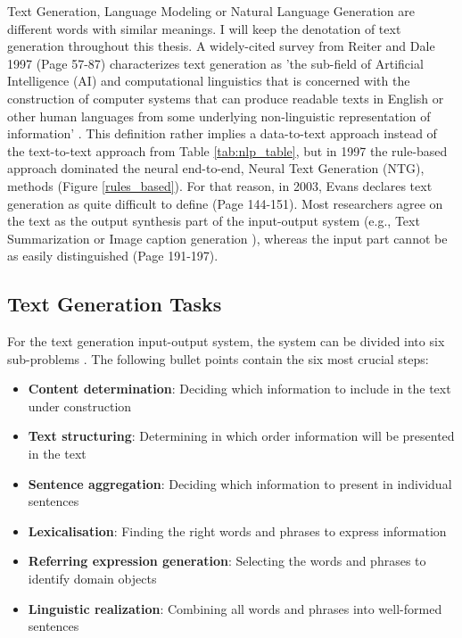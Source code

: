 Text Generation, Language Modeling or Natural Language Generation are different words with similar meanings. I will keep the denotation of text generation throughout this thesis. A widely-cited survey from Reiter and Dale 1997 (Page 57-87) \cite{reiter} characterizes text generation as 'the sub-field of Artificial Intelligence (AI) and computational linguistics that is concerned with the construction of computer systems that can produce readable texts in English or other human languages from some underlying non-linguistic representation of information' \cite{reiter}. This definition rather implies a data-to-text approach instead of the text-to-text approach from Table \ref{tab:nlp_table}, but in 1997 the rule-based approach dominated the neural end-to-end, Neural Text Generation (NTG), methods (Figure \ref{rules_based}). For that reason, in 2003, Evans declares text generation as quite difficult to define \cite{evans} (Page 144-151). Most researchers agree on the text as the output synthesis part of the input-output system (e.g., Text Summarization or Image caption generation \cite{mitchell}), whereas the input part cannot be as easily distinguished \cite{mcdonald} (Page 191-197).

\subsection{Text Generation Tasks}

For the text generation input-output system, the system can be divided into six sub-problems \cite{reiter}. The following bullet points contain the six most crucial steps:

\begin{itemize}
	\item \textbf{Content determination}: Deciding which information to include in the text under construction
	\item \textbf{Text structuring}: Determining in which order information will be presented in the text
	\item \textbf{Sentence aggregation}: Deciding which information to present in individual sentences
	\item \textbf{Lexicalisation}: Finding the right words and phrases to express information
	\item \textbf{Referring expression generation}: Selecting the words and phrases to identify domain objects
	\item \textbf{Linguistic realization}: Combining all words and phrases into well-formed sentences
\end{itemize}


